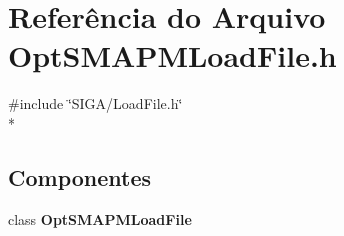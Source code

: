 \section{Referência do Arquivo Opt\+S\+M\+A\+P\+M\+Load\+File.\+h}
\label{_opt_s_m_a_p_m_load_file_8h}
{\ttfamily \#include \char`\"{}S\+I\+G\+A/\+Load\+File.\+h\char`\"{}}\\*
\subsection*{Componentes}
\begin{DoxyCompactItemize}
\item 
class {\bf Opt\+S\+M\+A\+P\+M\+Load\+File}
\end{DoxyCompactItemize}
